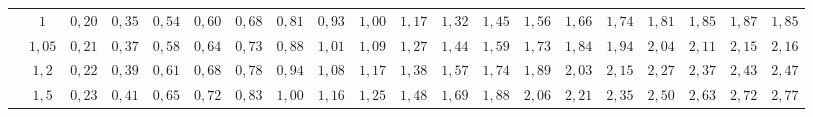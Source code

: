 \begin{table}[]
{\begin{tabular}{|c|c|c|c|c|c|c|c|c|c|c|c|c|c|c|c|c|c|c|c|}
                        & $1$                                                                                 & \cellcolor[HTML]{FFCCC9}$0,20$ & \cellcolor[HTML]{FFCCC9}$0,35$ & \cellcolor[HTML]{FFCCC9}$0,54$ & \cellcolor[HTML]{FFCCC9}$0,60$ & \cellcolor[HTML]{FFCCC9}$0,68$ & \cellcolor[HTML]{FFCCC9}$0,81$ & \cellcolor[HTML]{FFCCC9}$0,93$ & \cellcolor[HTML]{FD6864}$1,00$ & \cellcolor[HTML]{FD6864}$1,17$ & \cellcolor[HTML]{FD6864}$1,32$ & \cellcolor[HTML]{FD6864}$1,45$ & \cellcolor[HTML]{FE0000}$1,56$ & \cellcolor[HTML]{FE0000}$1,66$                        & \cellcolor[HTML]{FE0000}$1,74$ & \cellcolor[HTML]{FE0000}$1,81$ & \cellcolor[HTML]{CB0000}$1,85$ & \cellcolor[HTML]{CB0000}$1,87$ & \cellcolor[HTML]{CB0000}$1,85$ \\ \cline{2-20} 
                        & $1,05$                                                                              & \cellcolor[HTML]{FFCCC9}$0,21$ & \cellcolor[HTML]{FFCCC9}$0,37$ & \cellcolor[HTML]{FFCCC9}$0,58$ & \cellcolor[HTML]{FFCCC9}$0,64$ & \cellcolor[HTML]{FFCCC9}$0,73$ & \cellcolor[HTML]{FFCCC9}$0,88$ & \cellcolor[HTML]{FFCCC9}$1,01$ & \cellcolor[HTML]{FD6864}$1,09$ & \cellcolor[HTML]{FD6864}$1,27$ & \cellcolor[HTML]{FD6864}$1,44$ & \cellcolor[HTML]{FD6864}$1,59$ & \cellcolor[HTML]{FE0000}$1,73$ & \cellcolor[HTML]{FE0000}$1,84$                        & \cellcolor[HTML]{FE0000}$1,94$ & \cellcolor[HTML]{FE0000}$2,04$ & \cellcolor[HTML]{CB0000}$2,11$ & \cellcolor[HTML]{CB0000}$2,15$ & \cellcolor[HTML]{CB0000}$2,16$ \\ \cline{2-20} 
                        & $1,2$                                                                               & \cellcolor[HTML]{FFCCC9}$0,22$ & \cellcolor[HTML]{FFCCC9}$0,39$ & \cellcolor[HTML]{FFCCC9}$0,61$ & \cellcolor[HTML]{FFCCC9}$0,68$ & \cellcolor[HTML]{FFCCC9}$0,78$ & \cellcolor[HTML]{FFCCC9}$0,94$ & \cellcolor[HTML]{FFCCC9}$1,08$ & \cellcolor[HTML]{FD6864}$1,17$ & \cellcolor[HTML]{FD6864}$1,38$ & \cellcolor[HTML]{FD6864}$1,57$ & \cellcolor[HTML]{FD6864}$1,74$ & \cellcolor[HTML]{FE0000}$1,89$ & \cellcolor[HTML]{FE0000}$2,03$                        & \cellcolor[HTML]{FE0000}$2,15$ & \cellcolor[HTML]{FE0000}$2,27$ & \cellcolor[HTML]{CB0000}$2,37$ & \cellcolor[HTML]{CB0000}$2,43$ & \cellcolor[HTML]{CB0000}$2,47$ \\ \cline{2-20} 
                        & $1,5$                                                                               & \cellcolor[HTML]{FFCCC9}$0,23$ & \cellcolor[HTML]{FFCCC9}$0,41$ & \cellcolor[HTML]{FFCCC9}$0,65$ & \cellcolor[HTML]{FFCCC9}$0,72$ & \cellcolor[HTML]{FFCCC9}$0,83$ & \cellcolor[HTML]{FFCCC9}$1,00$ & \cellcolor[HTML]{FFCCC9}$1,16$ & \cellcolor[HTML]{FD6864}$1,25$ & \cellcolor[HTML]{FD6864}$1,48$ & \cellcolor[HTML]{FD6864}$1,69$ & \cellcolor[HTML]{FD6864}$1,88$ & \cellcolor[HTML]{FE0000}$2,06$ & \cellcolor[HTML]{FE0000}$2,21$                        & \cellcolor[HTML]{FE0000}$2,35$ & \cellcolor[HTML]{FE0000}$2,50$ & \cellcolor[HTML]{CB0000}$2,63$ & \cellcolor[HTML]{CB0000}$2,72$ & \cellcolor[HTML]{CB0000}$2,77$ \\ \cline{2-20} 

\end{tabular}}
\end{table}
